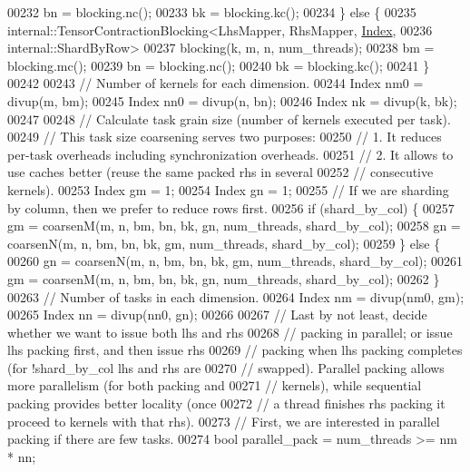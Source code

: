 \begin{DoxyCode}
00232       bn = blocking.nc();
00233       bk = blocking.kc();
00234     \} \textcolor{keywordflow}{else} \{
00235       internal::TensorContractionBlocking<LhsMapper, RhsMapper, \hyperlink{namespace_eigen_a62e77e0933482dafde8fe197d9a2cfde}{Index},
00236                                           internal::ShardByRow>
00237           blocking(k, m, n, num\_threads);
00238       bm = blocking.mc();
00239       bn = blocking.nc();
00240       bk = blocking.kc();
00241     \}
00242 
00243     \textcolor{comment}{// Number of kernels for each dimension.}
00244     Index nm0 = divup(m, bm);
00245     Index nn0 = divup(n, bn);
00246     Index nk = divup(k, bk);
00247 
00248     \textcolor{comment}{// Calculate task grain size (number of kernels executed per task).}
00249     \textcolor{comment}{// This task size coarsening serves two purposes:}
00250     \textcolor{comment}{// 1. It reduces per-task overheads including synchronization overheads.}
00251     \textcolor{comment}{// 2. It allows to use caches better (reuse the same packed rhs in several}
00252     \textcolor{comment}{// consecutive kernels).}
00253     Index gm = 1;
00254     Index gn = 1;
00255     \textcolor{comment}{// If we are sharding by column, then we prefer to reduce rows first.}
00256     \textcolor{keywordflow}{if} (shard\_by\_col) \{
00257       gm = coarsenM(m, n, bm, bn, bk, gn, num\_threads, shard\_by\_col);
00258       gn = coarsenN(m, n, bm, bn, bk, gm, num\_threads, shard\_by\_col);
00259     \} \textcolor{keywordflow}{else} \{
00260       gn = coarsenN(m, n, bm, bn, bk, gm, num\_threads, shard\_by\_col);
00261       gm = coarsenM(m, n, bm, bn, bk, gn, num\_threads, shard\_by\_col);
00262     \}
00263     \textcolor{comment}{// Number of tasks in each dimension.}
00264     Index nm = divup(nm0, gm);
00265     Index nn = divup(nn0, gn);
00266 
00267     \textcolor{comment}{// Last by not least, decide whether we want to issue both lhs and rhs}
00268     \textcolor{comment}{// packing in parallel; or issue lhs packing first, and then issue rhs}
00269     \textcolor{comment}{// packing when lhs packing completes (for !shard\_by\_col lhs and rhs are}
00270     \textcolor{comment}{// swapped). Parallel packing allows more parallelism (for both packing and}
00271     \textcolor{comment}{// kernels), while sequential packing provides better locality (once}
00272     \textcolor{comment}{// a thread finishes rhs packing it proceed to kernels with that rhs).}
00273     \textcolor{comment}{// First, we are interested in parallel packing if there are few tasks.}
00274     \textcolor{keywordtype}{bool} parallel\_pack = num\_threads >= nm * nn;

\end{DoxyCode}
